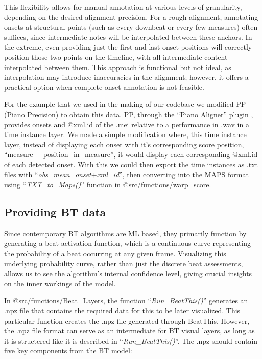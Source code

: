 This flexibility allows for manual annotation at various levels of granularity, depending on the desired alignment precision. For a rough alignment, annotating onsets at structural points (such as every downbeat or every few measures) often suffices, since intermediate notes will be interpolated between these anchors. In the extreme, even providing just the first and last onset positions will correctly position those two points on the timeline, with all intermediate content interpolated between them. This approach is functional but not ideal, as interpolation may introduce inaccuracies in the alignment; however, it offers a practical option when complete onset annotation is not feasible.

For the example that we used in the making of our codebase we modified PP (Piano Precision) to obtain this data. PP, through the ``Piano Aligner'' plugin \citep{jiangPIANOPRECISIONADVANCING2025}, provides onsets and @xml.id of the .mei relative to a performance in .wav in a time instance layer. We made a simple modification where, this time instance layer, instead of displaying each onset with it's corresponding score position, ``measure + position\_in\_measure'', it would display each corresponding @xml.id of each detected onset. With this we could then export the time instances as .txt files with  ``\textit{obs\_mean\_onset}+\textit{xml\_id}'', then converting into the MAPS format using ``\textit{TXT\_to\_Maps()}'' function in @src/functions/warp\_score.

\subsection{Providing BT data}
Since contemporary BT algorithms are ML based, they primarily function by generating a beat activation function, which is a continuous curve representing the probability of a beat occurring at any given frame. Visualizing this underlying probability curve, rather than just the discrete beat assessments, allows us to see the algorithm's internal confidence level, giving crucial insights on the inner workings of the model.

In @src/functions/Beat\_Layers, the function ``\textit{Run\_BeatThis()}'' generates an .npz file that contains the required data for this to be later visualized. This particular function creates the .npz file generated through BeatThis. However, the .npz file format can serve as an intermediate for BT visual layers, as long as it is structered like it is described in ``\textit{Run\_BeatThis()}''. The .npz should contain five key components from the BT model:

